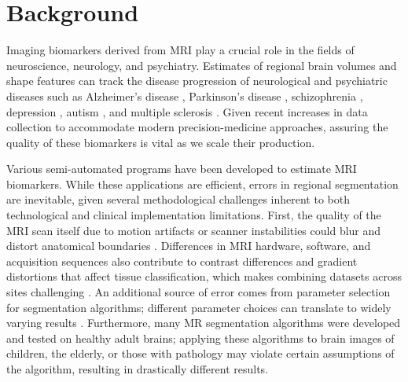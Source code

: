 \section{Background}


Imaging biomarkers derived from MRI play a crucial role in the fields of neuroscience, neurology, and psychiatry. Estimates of regional brain volumes and shape features can track the disease progression of  neurological and psychiatric diseases such as Alzheimer's disease \cite{18632739,Vemuri_2010}, Parkinson's disease \cite{Silvia_Mangia_2013}, schizophrenia \cite{shenton2001review}, depression \cite{meisenzahl2011structural}, autism \cite{brambilla2003brain}, and multiple sclerosis \cite{Filippi_1995}. Given recent increases in data collection to accommodate modern precision-medicine approaches, assuring the quality of these biomarkers is vital as we scale their production. 

Various semi-automated programs have been developed to estimate MRI biomarkers. While these applications are efficient, errors in regional segmentation are inevitable, given several methodological challenges inherent to both technological and clinical implementation limitations. First, the quality of the MRI scan itself due to motion artifacts or scanner instabilities could blur and distort anatomical boundaries \cite{Blumenthal_2002,Pardoe_2016,Reuter_2015,Savalia_2016}. Differences in MRI hardware, software, and acquisition sequences also contribute to contrast differences and gradient distortions that affect tissue classification, which makes combining datasets across sites challenging \cite{keshavan2016power}. An additional source of error comes from parameter selection for segmentation algorithms; different parameter choices can translate to widely varying results \cite{Han_2006}. Furthermore, many MR segmentation algorithms were developed and tested on healthy adult brains; applying these algorithms to brain images of children, the elderly, or those with pathology may violate certain assumptions of the algorithm, resulting in drastically different results. 

